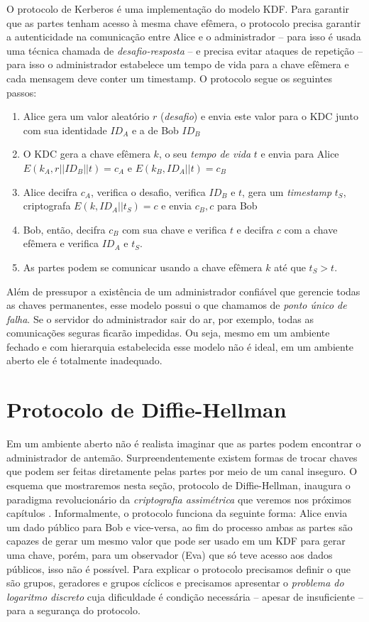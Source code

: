 O protocolo de Kerberos é uma implementação do modelo KDF.
Para garantir que as partes tenham acesso à mesma chave efêmera, o protocolo precisa garantir a autenticidade na comunicação entre Alice e o administrador -- para isso é usada uma técnica chamada de {\em desafio-resposta} -- e precisa evitar ataques de repetição -- para isso o administrador estabelece um tempo de vida para a chave efêmera e cada mensagem deve conter um timestamp.
O protocolo segue os seguintes passos:
\begin{enumerate}
\item Alice gera um valor aleatório $r$ ({\em desafio}) e envia este valor para o KDC junto com sua identidade $ID_A$ e a de Bob $ID_B$
\item O KDC gera a chave efêmera $k$, o seu {\em tempo de vida} $t$ e envia para  Alice $E(k_A, r||ID_B||t) = c_A$ e $E(k_B, ID_A||t) = c_B$
\item Alice decifra $c_A$, verifica o desafio, verifica $ID_B$ e $t$, gera um {\em timestamp} $t_S$, criptografa $E(k, ID_A||t_S) = c$ e envia $c_B, c$ para Bob
\item Bob, então, decifra $c_B$ com sua chave e verifica $t$ e decifra $c$ com a chave efêmera e verifica $ID_A$ e $t_S$.
\item As partes podem se comunicar usando a chave efêmera $k$ até que $t_S > t$.
\end{enumerate}

Além de pressupor a existência de um administrador confiável que gerencie todas as chaves permanentes, esse modelo possui o que chamamos de {\em ponto único de falha}.
Se o servidor do administrador sair do ar, por exemplo, todas as comunicações seguras ficarão impedidas.
Ou seja, mesmo em um ambiente fechado e com hierarquia estabelecida esse modelo não é ideal, em um ambiente aberto ele é totalmente inadequado.

\section{Protocolo de Diffie-Hellman}
\label{sec:diffie-hellman}

Em um ambiente aberto não é realista imaginar que as partes podem encontrar o administrador de antemão.
Surpreendentemente existem formas de trocar chaves que podem ser feitas diretamente pelas partes por meio de um canal inseguro.
O esquema que mostraremos nesta seção, protocolo de Diffie-Hellman, inaugura o paradigma revolucionário da {\em criptografia assimétrica} que veremos nos próximos capítulos \cite{Diffie76}.
Informalmente, o protocolo funciona da seguinte forma: Alice envia um dado público para Bob e vice-versa, ao fim do processo ambas as partes são capazes de gerar um mesmo valor que pode ser usado em um KDF para gerar uma chave, porém, para um observador (Eva) que só teve acesso aos dados públicos, isso não é possível.
Para explicar o protocolo precisamos definir o que são grupos, geradores e grupos cíclicos e precisamos apresentar o {\em problema do logaritmo discreto} cuja dificuldade é condição necessária -- apesar de insuficiente -- para a segurança do protocolo.

